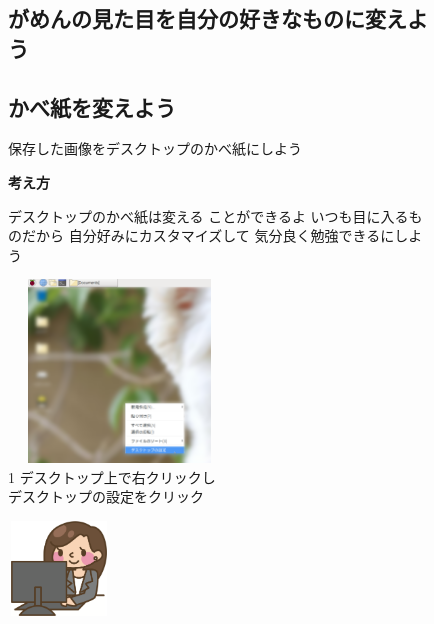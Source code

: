 \documentclass[a4paper,12pt]{jarticle}
\begin{document}
\begin{figure}
  \subsection{がめんの見た目を自分の好きなものに変えよう}
  \subsection{\theExercise かべ紙を変えよう}
  保存した画像をデスクトップのかべ紙にしよう

  \textbf{考え方}


  \bigskip



  \centering
  \begin{minipage}{\textwidth}
    \begin{minipage}{7.737cm}
      デスクトップのかべ紙は変える
      ことができるよ
      いつも目に入るものだから
      自分好みにカスタマイズして
      気分良く勉強できるにしよう
      \begin{minipage}{7.739cm}
        \includegraphics[width=5.892cm,height=4.864cm]{textbook-img107.png}\\
        1 デスクトップ上で右クリックし\\
        デスクトップの設定をクリック
      \end{minipage}
    \end{minipage}
    \begin{minipage}{2.582cm}
    \end{minipage}
    \begin{minipage}{7.737cm}
      \includegraphics[width=2.712cm,height=2.509cm]{textbook-img082.png}

\end{minipage}
\end{minipage}
\end{figure}
\end{document}

